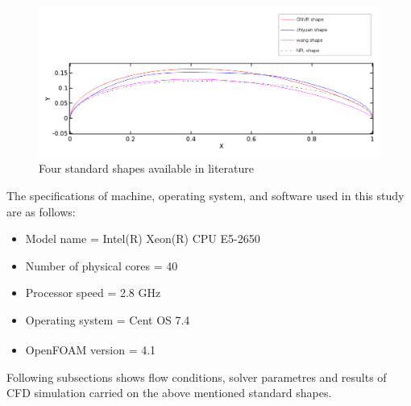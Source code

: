 \begin{figure}[H]
	\centering
	\includegraphics[width=400 pt]{rnd/all_profiles.png}
	\caption{Four standard shapes available in literature}
	\label{All profiles} 
\end{figure}
The specifications of machine, operating system, and software used in this study are as follows:
\begin{itemize}
	\item Model name = Intel(R) Xeon(R) CPU E5-2650
	\item Number of physical cores = 40
	\item Processor speed = 2.8 GHz
	\item Operating system = Cent OS 7.4
	\item OpenFOAM\textsuperscript{\textregistered} version = 4.1
\end{itemize}
Following subsections shows flow conditions, solver parametres and results of CFD simulation carried on the above mentioned standard shapes. 


